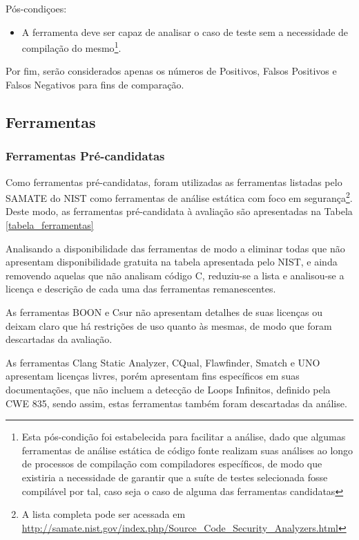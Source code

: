 Pós-condiçoes:
\begin{itemize}
  \item A ferramenta deve ser capaz de analisar o caso de teste sem a necessidade de compilação do mesmo\footnote{Esta pós-condição foi estabelecida para facilitar a análise, dado que algumas ferramentas de análise estática de código fonte realizam suas análises ao longo de processos de compilação com compiladores específicos, de modo que existiria a necessidade de garantir que a suíte de testes selecionada fosse compilável por tal, caso seja o caso de alguma das ferramentas candidatas}.
\end{itemize}

Por fim, serão considerados apenas os números de Positivos, Falsos Positivos e Falsos Negativos para fins de comparação.

\subsection{Ferramentas}

\subsubsection{Ferramentas Pré-candidatas}

Como ferramentas pré-candidatas, foram utilizadas as ferramentas listadas pelo SAMATE do NIST como ferramentas de análise estática com foco em segurança\footnote{A lista completa pode ser acessada em \url{http://samate.nist.gov/index.php/Source_Code_Security_Analyzers.html}}. Deste modo, as ferramentas pré-candidata à avaliação são apresentadas na Tabela \ref{tabela_ferramentas}


Analisando a disponibilidade das ferramentas de modo a eliminar todas que não apresentam disponibilidade gratuita na tabela apresentada pelo NIST, e ainda removendo aquelas que não analisam código C, reduziu-se a lista e analisou-se a licença e descrição de cada uma das ferramentas remanescentes.

As ferramentas BOON e Csur não apresentam detalhes de suas licenças ou deixam claro que há restrições de uso quanto às mesmas, de modo que foram descartadas da avaliação.

As ferramentas Clang Static Analyzer, CQual, Flawfinder, Smatch e UNO apresentam licenças livres, porém apresentam fins específicos em suas documentações, que não incluem a detecção de Loops Infinitos, definido pela CWE 835, sendo assim, estas ferramentas também foram descartadas da análise.

